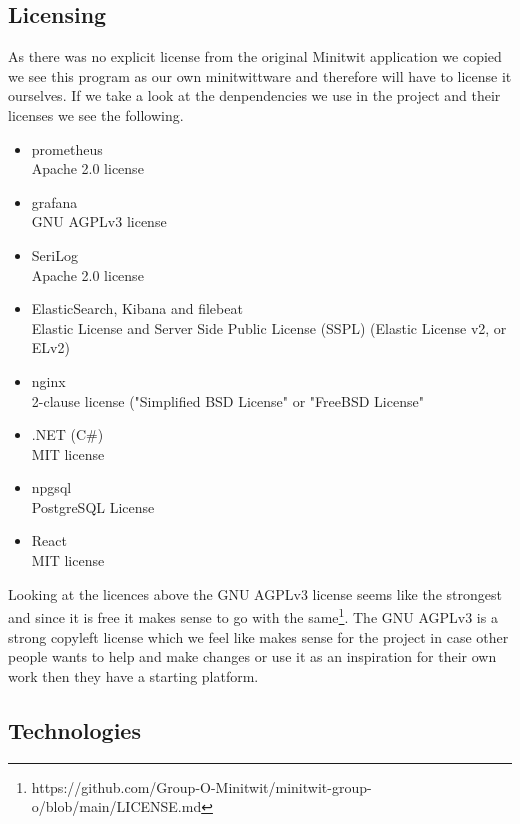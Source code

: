 \documentclass{article}
\begin{document}
\subsection{Licensing}
As there was no explicit license from the original Minitwit application we copied we see this program as our own minitwittware and therefore will have to license it ourselves. If we take a look at the denpendencies we use in the project and their licenses we see the following.
\begin{itemize}
    \item prometheus\\
    Apache 2.0 license
    \item grafana\\
    GNU AGPLv3 license
    \item SeriLog\\
    Apache 2.0 license
    \item ElasticSearch, Kibana and filebeat\\
    Elastic License and Server Side Public License (SSPL) (Elastic License v2, or ELv2) 
    \item nginx\\
    2-clause license ("Simplified BSD License" or "FreeBSD License"
    \item .NET (C\#)\\
    MIT license
    \item npgsql\\
    PostgreSQL License
    \item React\\
    MIT license
\end{itemize} 
Looking at the licences above the GNU AGPLv3 license seems like the strongest and since it is free it makes sense to go with the same\footnote{https://github.com/Group-O-Minitwit/minitwit-group-o/blob/main/LICENSE.md}. The GNU AGPLv3 is a strong copyleft license which we feel like makes sense for the project in case other people wants to help and make changes or use it as an inspiration for their own work then they have a starting platform.

\subsection{Technologies}
\label{technologies}
\end{document}
